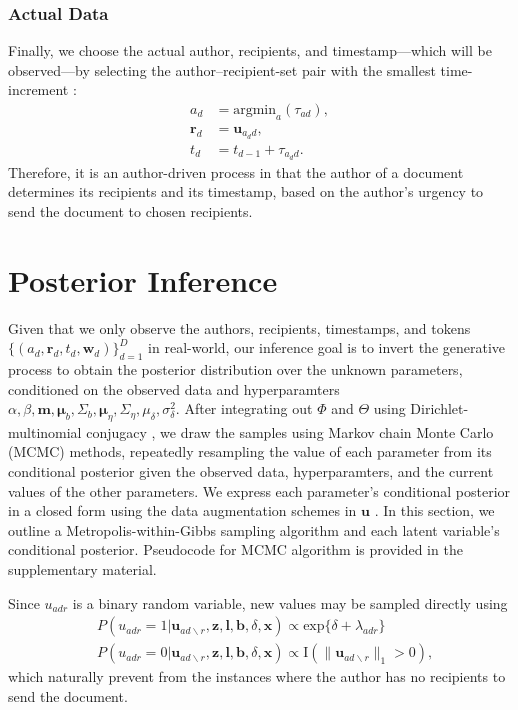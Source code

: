 \documentclass{article}
\begin{document}
\subsubsection{Actual Data}\label{subsubsec:Actual Data}
Finally, we choose the actual author, recipients, and timestamp---which will be observed---by selecting the author--recipient-set pair with the smallest time-increment \cite{snijders1996stochastic,snijders2017stochastic}:
\begin{equation}
\begin{aligned}
a_d &= \mbox{argmin}_{a}(\tau_{ad}),\\
\boldsymbol{r}_d &= \boldsymbol{u}_{a_d d},\\
t_d &=t_{d-1} + \tau_{a_d d}.
\end{aligned}
\end{equation}
Therefore, it is an author-driven process in that the author of a document determines its recipients and its timestamp, based on the author's urgency to send the document to chosen recipients. 

\section{Posterior Inference}\label{sec:Inference}
Given that we only observe the authors, recipients, timestamps, and tokens $ \{ (a_d, \boldsymbol{r}_d, t_d,  \boldsymbol{w}_d)\}_{d=1}^D$ in real-world, our inference goal is to invert the generative process to obtain the posterior distribution over the unknown parameters, conditioned on the observed data and hyperparamters $\alpha, \beta, \boldsymbol{m}, \boldsymbol{\mu}_b, \Sigma_b, \boldsymbol{\mu}_\eta, \Sigma_\eta, {\mu}_\delta,\sigma^2_\delta$. After integrating out $\Phi$ and $\Theta$ using Dirichlet-multinomial conjugacy \cite{griffiths2004finding}, we draw the samples using Markov chain Monte Carlo (MCMC) methods, repeatedly resampling the value of each parameter from its conditional posterior given the observed data, hyperparamters, and the current values of the other parameters. We express each parameter’s conditional posterior in a closed form using the data augmentation schemes in $\boldsymbol{u}$ \cite{tanner1987calculation}. In this section, we outline a Metropolis-within-Gibbs sampling algorithm and each latent variable's conditional posterior. Pseudocode for MCMC algorithm is provided in the supplementary material.

Since $u_{adr}$ is a binary random variable, new values may be sampled directly using
\begin{equation}
\begin{aligned}
 &P(u_{adr}=1| \boldsymbol{u}_{ad\backslash r}, \boldsymbol{z},\boldsymbol{l},\boldsymbol{b}, \delta, \boldsymbol{x})
 \propto \mbox{exp}\{\delta+\lambda_{adr}\}\\
 &P(u_{adr}=0| \boldsymbol{u}_{ad\backslash r}, \boldsymbol{z},\boldsymbol{l},\boldsymbol{b}, \delta, \boldsymbol{x})\propto \text{I}(\lVert\boldsymbol{u}_{ad\backslash r}\rVert_1 > 0 ),
\end{aligned}
\label{eqn:latentreceiver}
\end{equation}
which naturally prevent from the instances where the author has no recipients to send the document.
\end{document}
